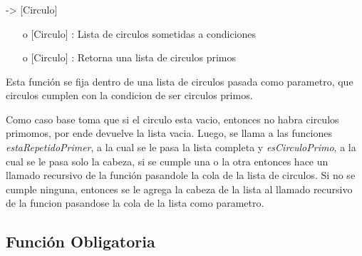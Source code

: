 \documentclass[10pt,journal]{IEEEtran}
\begin{document}
\subsubsection{\color{Red}{listaCircAux}}
\begin{description}[style=nextline]
        \item[\color{Green}{Signatura}] [Circulo] -> [Circulo]
        \begin{itemize} 
        \item [o]  [Circulo] : Lista de circulos sometidas a condiciones
        \item [o]  [Circulo] : Retorna una lista de circulos primos
        \end{itemize}        
        
        \item[\color{Green}{Descripción}]   Esta función se fija dentro de una lista de circulos pasada como parametro, que circulos cumplen con la condicion de ser circulos primos.
        
        Como caso base toma que si el circulo esta vacio, entonces no habra circulos primomos, por ende devuelve la lista vacia. Luego, se llama a las funciones \textit{estaRepetidoPrimer}, a la cual se le pasa la lista completa y \textit{esCirculoPrimo}, a la cual se le pasa solo la cabeza, si se cumple  una o la otra entonces hace un llamado recursivo de la función  pasandole la cola de la lista de circulos. Si no se cumple ninguna, entonces se le agrega la cabeza de la lista al llamado recursivo de la funcion pasandose la cola de la lista como parametro.
\end{description}

\subsection{Función Obligatoria}
\end{document}
